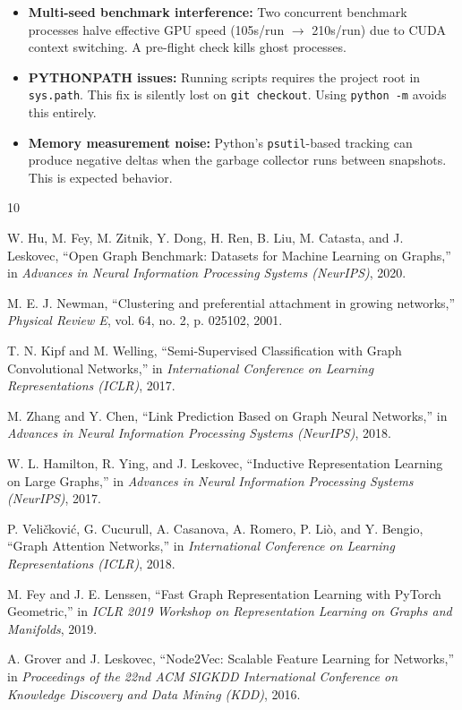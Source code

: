 \documentclass[12pt,a4paper]{article}
\begin{document}
\begin{itemize}[nosep]
    \item \textbf{Multi-seed benchmark interference:} Two concurrent benchmark processes halve effective GPU speed (105s/run $\rightarrow$ 210s/run) due to CUDA context switching. A pre-flight check kills ghost processes.
    \item \textbf{PYTHONPATH issues:} Running scripts requires the project root in \texttt{sys.path}. This fix is silently lost on \texttt{git checkout}. Using \texttt{python -m} avoids this entirely.
    \item \textbf{Memory measurement noise:} Python's \texttt{psutil}-based tracking can produce negative deltas when the garbage collector runs between snapshots. This is expected behavior.
\end{itemize}
\begin{thebibliography}{10}

W. Hu, M. Fey, M. Zitnik, Y. Dong, H. Ren, B. Liu, M. Catasta, and J. Leskovec,
``Open Graph Benchmark: Datasets for Machine Learning on Graphs,''
in \textit{Advances in Neural Information Processing Systems (NeurIPS)}, 2020.

M. E. J. Newman,
``Clustering and preferential attachment in growing networks,''
\textit{Physical Review E}, vol. 64, no. 2, p. 025102, 2001.

T. N. Kipf and M. Welling,
``Semi-Supervised Classification with Graph Convolutional Networks,''
in \textit{International Conference on Learning Representations (ICLR)}, 2017.

M. Zhang and Y. Chen,
``Link Prediction Based on Graph Neural Networks,''
in \textit{Advances in Neural Information Processing Systems (NeurIPS)}, 2018.

W. L. Hamilton, R. Ying, and J. Leskovec,
``Inductive Representation Learning on Large Graphs,''
in \textit{Advances in Neural Information Processing Systems (NeurIPS)}, 2017.

P. Veličković, G. Cucurull, A. Casanova, A. Romero, P. Liò, and Y. Bengio,
``Graph Attention Networks,''
in \textit{International Conference on Learning Representations (ICLR)}, 2018.

M. Fey and J. E. Lenssen,
``Fast Graph Representation Learning with PyTorch Geometric,''
in \textit{ICLR 2019 Workshop on Representation Learning on Graphs and Manifolds}, 2019.

A. Grover and J. Leskovec,
``Node2Vec: Scalable Feature Learning for Networks,''
in \textit{Proceedings of the 22nd ACM SIGKDD International Conference on Knowledge Discovery and Data Mining (KDD)}, 2016.

\end{thebibliography}
\end{document}
